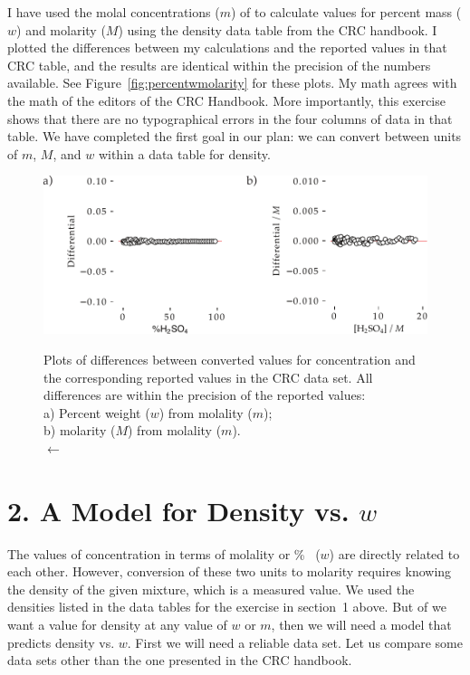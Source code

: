 \documentclass[]{tufte-handout}
\begin{document}
I have used the molal concentrations ($m$) of  to calculate values for percent mass ($w$) and molarity ($M$) using the density data table from the CRC handbook. I plotted the differences between my calculations and the reported values in that CRC table, and the results are identical within the precision of the numbers available. See Figure~\vref{fig:percentwmolarity} for these plots. My math agrees with the math of the editors of the CRC Handbook. More importantly, this exercise shows that there are no typographical errors in the four columns of data in that table. We have completed the first goal in our plan: we can convert between units of $m$, $M$, and $w$ within a data table for density.

\begin{figure}
  \centering
  \caption{Plots of differences between converted values for concentration and the corresponding reported values in the CRC data set. All differences are within the precision of the reported values: \\ a) Percent weight ($w$) from molality ($m$); \\ b) molarity ($M$) from molality ($m$). \\ $\longleftarrow$} 
 \includegraphics[scale=0.65]{images/differentials} 
  \label{fig:percentwmolarity}
\end{figure}


\newpage

\section{2. A Model for Density vs. $w$ }

The values of concentration in terms of molality or \unit{\percent{}} ($w$) are directly related to each other. However, conversion of these two units to molarity requires knowing the density of the given mixture, which is a measured value. We used the densities listed in the data tables for the exercise in section~1 above. But of we want a value for density at any value of $w$ or $m$, then we will need a model that predicts density vs. $w$. First we will need a reliable data set. Let us compare some data sets other than the one presented in the CRC handbook.
\end{document}
